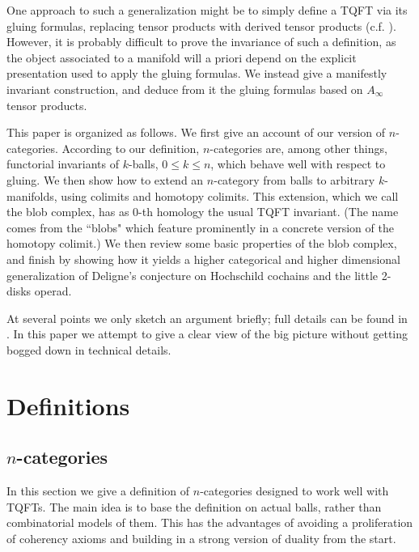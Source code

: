\documentclass{pnastwo}
\begin{document}
\begin{article}
One approach to such a generalization might be to simply define a
TQFT via its gluing formulas, replacing tensor products with
derived tensor products (c.f. \cite{1011.1958}).
However, it is probably difficult to prove
the invariance of such a definition, as the object associated to a manifold
will a priori depend on the explicit presentation used to apply the gluing formulas.
We instead give a manifestly invariant construction, and
deduce from it the gluing formulas based on $A_\infty$ tensor products.

This paper is organized as follows.
We first give an account of our version of $n$-categories.
According to our definition, $n$-categories are, among other things,
functorial invariants of $k$-balls, $0\le k \le n$, which behave well with respect to gluing.
We then show how to extend an $n$-category from balls to arbitrary $k$-manifolds,
using colimits and homotopy colimits.
This extension, which we call the blob complex, has as $0$-th homology the usual TQFT invariant.
(The name comes from the ``blobs" which feature prominently
in a concrete version of the homotopy colimit.)
We then review some basic properties of the blob complex, and finish by showing how it
yields a higher categorical and higher dimensional generalization of Deligne's
conjecture on Hochschild cochains and the little 2-disks operad.

At several points we only sketch an argument briefly; full details can be found in \cite{1009.5025}. 
In this paper we attempt to give a clear view of the big picture without getting 
bogged down in technical details.


\section{Definitions}
\subsection{$n$-categories} \mbox{}

In this section we give a definition of $n$-categories designed to work well with TQFTs.
The main idea is to base the definition on actual balls, rather than combinatorial models of them.
This has the advantages of avoiding a proliferation of coherency axioms and building in a strong
version of duality from the start.



\end{article}
\end{document}
